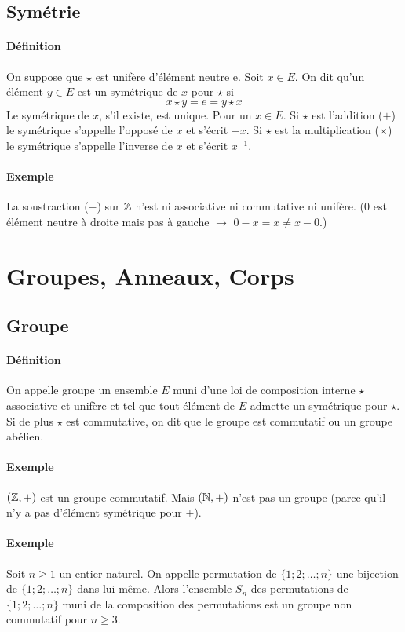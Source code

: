 %
\subsection{Symétrie}
%
\paragraph{Définition} On suppose que $\star$ est unifère d'élément neutre e. Soit $x \in E$. On dit qu'un élément $y \in E$ est un symétrique de $x$ pour $\star$ si
$$ x \star y = e = y \star x$$
Le symétrique de $x$, s'il existe, est unique. Pour un $x \in E$. Si $\star$ est l'addition ($+$) le symétrique s'appelle l'opposé de $x$ et s'écrit $-x$. Si $\star$ est la multiplication ($\times$) le symétrique s'appelle l'inverse de $x$ et s'écrit $x^{-1}$.
 
\paragraph{Exemple} La soustraction ($-$) sur $\mathbb{Z}$ n'est ni associative ni commutative ni unifère. ($0$ est élément neutre à droite mais pas à gauche $\rightarrow$ $0 - x = x \neq x - 0$.)

%
%
\section{Groupes, Anneaux, Corps}
%
%
%
\subsection{Groupe}
%
\paragraph{Définition} On appelle groupe un ensemble $E$ muni d'une loi de composition interne $\star$ associative et unifère et tel que tout élément de $E$ admette un symétrique pour $\star$. \\
Si de plus $\star$ est commutative, on dit que le groupe est commutatif ou un groupe abélien.

\paragraph{Exemple}
$(\mathbb{Z}, +)$ est un groupe commutatif. Mais $(\mathbb{N}, +)$ n'est pas un groupe (parce qu'il n'y a pas d'élément symétrique pour $+$).

\paragraph{Exemple} Soit $n \geq 1$ un entier naturel. On appelle permutation de $\{ 1; 2; \ldots ; n\}$ une bijection de $\{ 1; 2; \ldots ; n\}$ dans lui-même. Alors l'ensemble $S_n$ des permutations de $\{ 1; 2; \ldots ; n\}$ muni de la composition des permutations est un groupe non commutatif pour $n \geq 3$.

